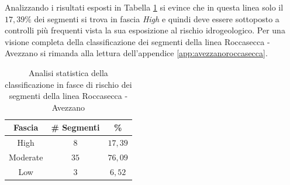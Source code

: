 \newline
Analizzando i risultati esposti in Tabella \ref{percentualeavezzanoroccasecca} si evince che in questa linea solo il $17,39\%$ dei segmenti si trova in fascia \textit{High} e quindi deve essere sottoposto a controlli più frequenti vista la sua esposizione al rischio idrogeologico. 
Per una visione completa della classificazione dei segmenti della linea Roccasecca - Avezzano si rimanda alla lettura dell'appendice \ref{app:avezzanoroccasecca}.
\begin{table}[hpt]
\centering
\begin{tabular}{|c|c|c|}
\hline \rowcolor{lightgray}
Fascia   & \# Segmenti & \%    \\ \hline \rowcolor{flamingopink}
High     & $8$           & $17,39$     \\ \hline \rowcolor{icterine}
Moderate & $35$          & $76,09$ \\ \hline \rowcolor{inchworm}
Low      & $3$          & $6,52$ \\ \hline
\end{tabular}
\caption{Analisi statistica della classificazione in fasce di rischio dei segmenti della linea Roccasecca - Avezzano}
\label{percentualeavezzanoroccasecca}
\end{table}
\newpage
